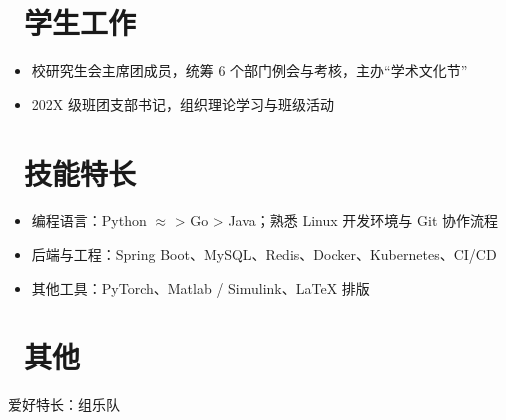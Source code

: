 \documentclass[11pt]{article}
\newcommand{\cvsection}[2]{%
  \section{\texorpdfstring{\makebox[\widthof{\faGraduationCap}][c]{\color{CVBlue}#1}\ #2}{#2}}}
\begin{document}
\cvsection{\faUsers}{学生工作}
\begin{itemize}
	\item 校研究生会主席团成员，统筹 6 个部门例会与考核，主办“学术文化节”
	\item 202X 级班团支部书记，组织理论学习与班级活动
\end{itemize}

\cvsection{\faWrench}{技能特长}
\begin{itemize}[parsep=0.5ex]
	\item 编程语言：Python $\approx$ \Cpp > Go > Java；熟悉 Linux 开发环境与 Git 协作流程
	\item 后端与工程：Spring Boot、MySQL、Redis、Docker、Kubernetes、CI/CD
	\item 其他工具：PyTorch、Matlab / Simulink、\LaTeX{} 排版
\end{itemize}

\cvsection{\faTags}{其他}
爱好特长：组乐队
\end{document}
